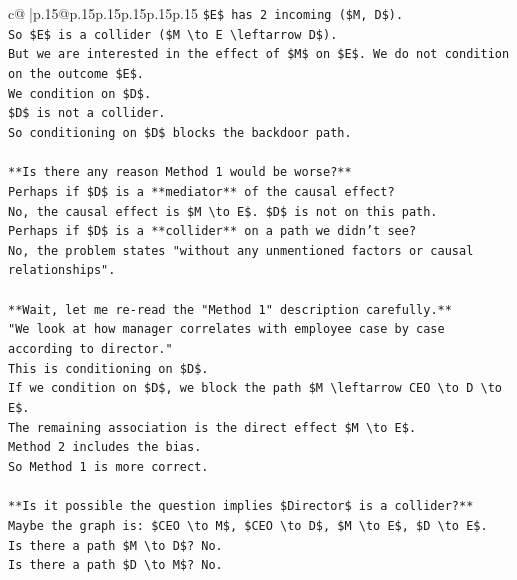 \documentclass{article}
\begin{document}
{\begin{supertabular}{c@{$\;$}|p{.15\linewidth}@{}p{.15\linewidth}p{.15\linewidth}p{.15\linewidth}p{.15\linewidth}p{.15\linewidth}}
{{{\texttt{\$E\$ has 2 incoming (\$M, D\$).} \\
\texttt{So \$E\$ is a collider (\$M \textbackslash{}to E \textbackslash{}leftarrow D\$).} \\
\texttt{But we are interested in the effect of \$M\$ on \$E\$. We do not condition on the outcome \$E\$.} \\
\texttt{We condition on \$D\$.} \\
\texttt{\$D\$ is not a collider.} \\
\texttt{So conditioning on \$D\$ blocks the backdoor path.} \\
\\ 
\texttt{**Is there any reason Method 1 would be worse?**} \\
\texttt{Perhaps if \$D\$ is a **mediator** of the causal effect?} \\
\texttt{No, the causal effect is \$M \textbackslash{}to E\$. \$D\$ is not on this path.} \\
\texttt{Perhaps if \$D\$ is a **collider** on a path we didn't see?} \\
\texttt{No, the problem states "without any unmentioned factors or causal relationships".} \\
\\ 
\texttt{**Wait, let me re{-}read the "Method 1" description carefully.**} \\
\texttt{"We look at how manager correlates with employee case by case according to director."} \\
\texttt{This is conditioning on \$D\$.} \\
\texttt{If we condition on \$D\$, we block the path \$M \textbackslash{}leftarrow CEO \textbackslash{}to D \textbackslash{}to E\$.} \\
\texttt{The remaining association is the direct effect \$M \textbackslash{}to E\$.} \\
\texttt{Method 2 includes the bias.} \\
\texttt{So Method 1 is more correct.} \\
\\ 
\texttt{**Is it possible the question implies \$Director\$ is a collider?**} \\
\texttt{Maybe the graph is: \$CEO \textbackslash{}to M\$, \$CEO \textbackslash{}to D\$, \$M \textbackslash{}to E\$, \$D \textbackslash{}to E\$.} \\
\texttt{Is there a path \$M \textbackslash{}to D\$? No.} \\
\texttt{Is there a path \$D \textbackslash{}to M\$? No.} \\
}}}
\end{supertabular}}
\end{document}
